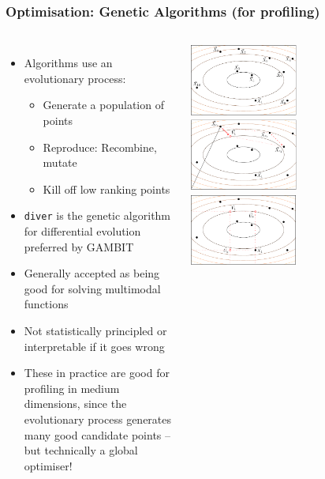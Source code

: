 \documentclass[aspectratio=169]{beamer}
\begin{document}
\begin{frame}
    \frametitle{Optimisation: Genetic Algorithms (for profiling)}
    \begin{columns}
        \begin{itemize}
            \item Algorithms use an evolutionary process:
                \begin{itemize}
                    \item Generate a population of points
                    \item Reproduce: Recombine, mutate
                    \item Kill off low ranking points
                \end{itemize}
            \item \texttt{diver} is the genetic algorithm for differential evolution preferred by GAMBIT
            \item Generally accepted as being good for solving multimodal functions
            \item Not statistically principled or interpretable if it goes wrong
            \item These in practice are good for profiling in medium dimensions, since the evolutionary process generates many good candidate points -- but technically a global optimiser!
        \end{itemize}
        \includegraphics[width=0.5\textwidth]{figures/diver_1}%
        \includegraphics[width=0.5\textwidth]{figures/diver_2}
        \includegraphics[width=0.5\textwidth]{figures/diver_3}%

\end{columns}
\end{frame}
\end{document}
